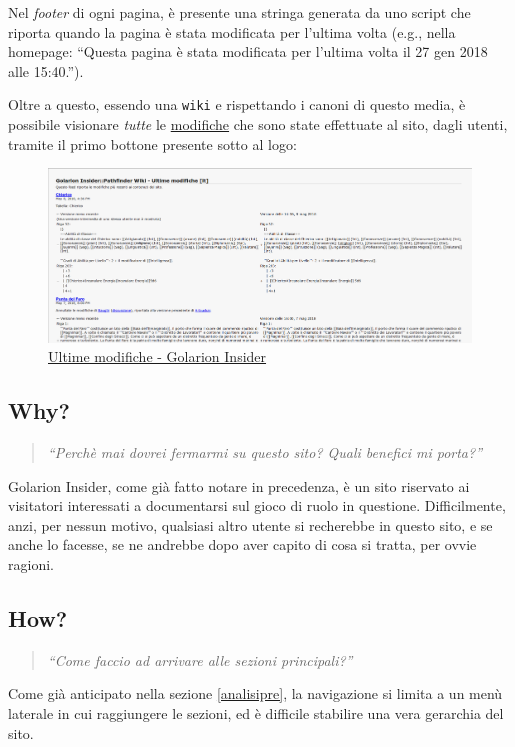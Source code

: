 Nel \emph{footer} di ogni pagina, è presente una stringa generata da uno script che riporta quando la pagina è stata 
modificata per l'ultima volta (e.g., nella homepage: ``Questa pagina è stata modificata per l'ultima volta il 27 gen 2018 alle 15:40.'').

Oltre a questo, essendo una \texttt{wiki} e rispettando i canoni di questo media, è possibile visionare \emph{tutte} le
\href{http://golarion.altervista.org/api.php?hidebots=1&days=7&limit=50&hidecategorization=1&action=feedrecentchanges&feedformat=atom}{modifiche}
che sono state effettuate al sito, dagli utenti, tramite il primo bottone presente sotto al logo: 

\begin{figure}[hbt]
    \includegraphics[width=\textwidth]{img/ultime_modifiche.png}
    \caption{\href{http://golarion.altervista.org/api.php?hidebots=1&days=7&limit=50&hidecategorization=1&action=feedrecentchanges&feedformat=atom}{Ultime modifiche - Golarion Insider}}
\end{figure}

\subsection{Why?}
\begin{quote}
    \emph{``Perchè mai dovrei fermarmi su questo sito? Quali benefici mi porta?''}
\end{quote}

Golarion Insider, come già fatto notare in precedenza, è un sito riservato ai visitatori interessati a documentarsi sul
gioco di ruolo in questione. Difficilmente, anzi, per nessun motivo, qualsiasi altro utente si recherebbe in questo sito, e
se anche lo facesse, se ne andrebbe dopo aver capito di cosa si tratta, per ovvie ragioni.

\subsection{How?}
\begin{quote}
    \emph{``Come faccio ad arrivare alle sezioni principali?''}
\end{quote}
Come già anticipato nella sezione \ref{analisipre}, la navigazione si limita a un menù laterale in cui raggiungere le sezioni,
ed è difficile stabilire una vera gerarchia del sito.

